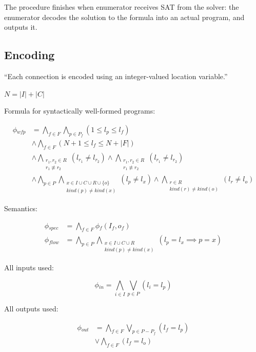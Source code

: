 The procedure finishes when enumerator receives SAT from the solver: the
enumerator decodes the solution to the formula into an actual program, and
outputs it.


\subsection{Encoding}
\label{sec:encoding}


``Each connection is encoded using an integer-valued location variable.''

\(N = |I| + |C|\)

Formula for syntactically well-formed programs:

\begin{align*}
  \phi{}_{wfp} &= \bigwedge_{f \in F}\bigwedge_{p \in P_f} (1 \leq l_p \leq l_f) \\
  &\wedge \bigwedge_{f \in F} (N + 1 \leq l_f \leq N + |F|) \\
  &\wedge \bigwedge_{\substack{r_1, r_2 \in R\\ r_1 \not\equiv r_2}} (l_{r_1} \neq l_{r_2})
   \wedge \bigwedge_{\substack{r_1, r_2 \in R\\ r_1 \not\equiv r_2}} (l_{r_1} \neq l_{r_2}) \\
  &\wedge \bigwedge_{p \in P}\bigwedge_{\substack{x \in I \cup C \cup R \cup \{o\} \\ kind(p) \neq kind(x)}} (l_p \neq l_x)
   \wedge \bigwedge_{\substack{r \in R \\ kind(r) \neq kind(o)}} (l_r \neq l_o)
\end{align*}

Semantics:

\begin{align*}
  \phi{}_{spec} &= \bigwedge_{f \in F} \phi{}_f (I_f, o_f) \\
  \phi{}_{flow} &= \bigwedge_{p \in P}\bigwedge_{\substack{x \in I \cup C \cup R \\ kind(p) \neq kind(x)}} (l_p = l_x \implies p = x)
\end{align*}

All inputs used:

\[ \phi{}_{in} = \bigwedge_{i \in I}\bigvee_{p \in P}(l_i = l_p) \]

All outputs used:

\begin{align*}
  \phi{}_{out} &= \bigwedge_{f \in F}\bigvee_{p \in P - P_f}(l_f = l_p) \\
               &\vee \bigwedge_{f \in F} (l_f = l_o)
\end{align*}

